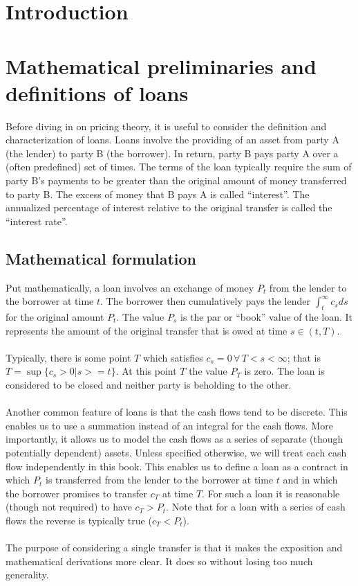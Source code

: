 \documentclass{article}
\theoremstyle{definition}
\begin{document}
\section{Introduction}



\section{Mathematical preliminaries and definitions of loans}
Before diving in on pricing theory, it is useful to consider the definition and characterization of loans.  Loans involve the providing of an asset from party A (the lender) to party B (the borrower).  In return, party B pays party A over a (often predefined) set of times.  The terms of the loan typically require the sum of party B's payments to be greater than the original amount of money transferred to party B.  The excess of money that B pays A is called ``interest''.  The annualized percentage of interest relative to the original transfer is called the ``interest rate''.  

\subsection{Mathematical formulation}
Put mathematically, a loan involves an exchange of money \(P_t\) from the lender to the borrower at time \(t\).  The borrower then cumulatively pays the lender \(\int_t ^ \infty c_s ds\) for the original amount \(P_t\).  The value \(P_s\) is the par or ``book'' value of the loan.  It represents the amount of the original transfer that is owed at time \(s \in (t, T)\).
\\
\\
Typically, there is some point \(T\) which satisfies \(c_s=0\, \forall\, T<s<\infty\); that is \(T= \sup\{c_s>0 | s>=t\} \).  At this point \(T\) the value \(P_T\) is zero.  The loan is considered to be closed and neither party is beholding to the other.  
\\
\\
Another common feature of loans is that the cash flows tend to be discrete.  This enables us to use a summation instead of an integral for the cash flows.  More importantly, it allows us to model the cash flows as a series of separate (though potentially dependent) assets.  Unless specified otherwise, we will treat each cash flow independently in this book.  This enables us to define a loan as a contract in which \(P_t\) is transferred from the lender to the borrower at time \(t\) and in which the borrower promises to transfer \(c_T\) at time \(T\). For such a loan it is reasonable (though not required) to have \(c_T>P_t\).  Note that for a loan with a series of cash flows the reverse is typically true (\(c_T<P_t\)).  
\\
\\
The purpose of considering a single transfer is that it makes the exposition and mathematical derivations more clear.  It does so without losing too much generality. 
\end{document}
